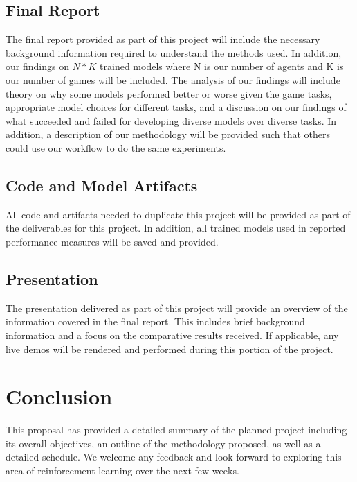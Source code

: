 \documentclass[conference]{IEEEtran}
\begin{document}
\subsection{Final Report}
The final report provided as part of this project will include the necessary background information required to understand the methods used.
In addition, our findings on $N*K$ trained models where N is our number of agents and K is our number of games will be included.
The analysis of our findings will include theory on why some models performed better or worse given the game tasks, appropriate model choices for different tasks, and a discussion on our findings of what succeeded and failed for developing diverse models over diverse tasks.
In addition, a description of our methodology will be provided such that others could use our workflow to do the same experiments.

\subsection{Code and Model Artifacts}
All code and artifacts needed to duplicate this project will be provided as part of the deliverables for this project.
In addition, all trained models used in reported performance measures will be saved and provided.

\subsection{Presentation}
The presentation delivered as part of this project will provide an overview of the information covered in the final report.
This includes brief background information and a focus on the comparative results received.
If applicable, any live demos will be rendered and performed during this portion of the project.

\section{Conclusion} \label{conclusion}
This proposal has provided a detailed summary of the planned project including its overall objectives, an outline of the methodology proposed, as well as a detailed schedule.
We welcome any feedback and look forward to exploring this area of reinforcement learning over the next few weeks.

{}


\vspace{12pt}
\end{document}

